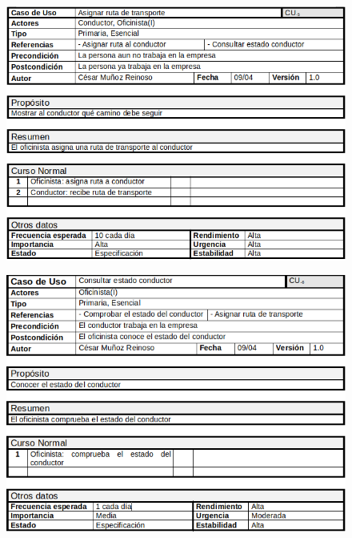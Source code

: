\begin{figure}[H]
	\centering
	\includegraphics[width=16cm]{5}
\end{figure}
\begin{figure}[H]
	\centering
	\includegraphics[width=16cm]{6}
\end{figure}
